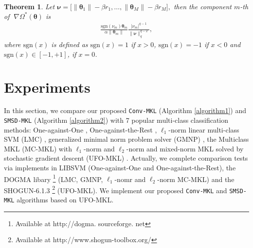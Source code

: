 \documentclass{article}
\newtheorem{lemma}{Lemma}
\newtheorem{theorem}{Theorem}
\newtheorem{remark}{Remark}
\begin{document}
\begin{theorem}
\label{theorem-fenchel-dual}
Let
$
    \bm \nu=\Big[\|\pmb{\theta}_1\|-\beta r_1,\ldots,
    \|\pmb{\theta}_M\|-\beta r_M\Big],
$
then the component $m$-th of $\;\nabla\Omega^\ast(\pmb{\theta})$ is
\begin{align*}
\frac{\mathrm{sgn}(\nu_m) \pmb{\theta}_m}{\alpha\|\pmb{\theta}_m\|}
       \frac{|\nu_m|^{q-1}}{\|\bm \nu\|_q^{q-2}},
\end{align*}
where $\mathrm{sgn}(x)$ is defined as
$\mathrm{sgn}(x)=1$ if $x>0$, $\mathrm{sgn}(x)=-1$ if $x<0$
and $\mathrm{sgn}(x)\in[-1,+1]$, if $x=0$.
\end{theorem}




\section{Experiments}
In this section, we compare our proposed \texttt{Conv-MKL} (Algorithm \ref{algorithm1}) and \texttt{SMSD-MKL} (Algorithm \ref{algorithm2})
with 7 popular multi-class classification methods:
 One-against-One \cite{knerr1990single}, One-against-the-Rest \cite{bottou1994comparison},
$\ell_1$-norm linear multi-class SVM (LMC) \cite{CrammerS02},
generalized minimal norm problem solver (GMNP) \cite{franc2005optimization},
the Multiclass MKL (MC-MKL) with $\ell_1$-norm and $\ell_2$-norm \cite{ZienO2007}
and mixed-norm MKL solved by stochastic gradient descent (UFO-MKL) \cite{OrabonaL11}.
Actually, we complete comparison tests via implements in LIBSVM
(One-against-One and One-against-the-Rest),
the DOGMA libary \footnote{Available at http://dogma. sourceforge. net}
(LMC, GMNP,
$\ell_1$-nomr and $\ell_2$-norm MC-MKL) and the SHOGUN-6.1.3
\footnote{Available at http://www.shogun-toolbox.org/}
(UFO-MKL).
We implement our proposed \texttt{Conv-MKL} and \texttt{SMSD-MKL} algorithms based on UFO-MKL.
\end{document}
